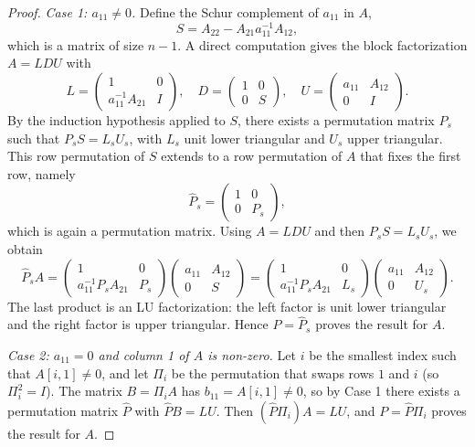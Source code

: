 \documentclass[10pt,twoside]{siamart1116}
\numberwithin{theorem}{section}
\begin{document}
\begin{proof}
  \emph{Case 1: $a_{11} \neq 0$.} Define the Schur complement of $a_{11}$ in $A$,
  \[
    S = A_{22} - A_{21} a_{11}^{-1} A_{12},
  \]
  which is a matrix of size $n-1$. A direct computation gives the block factorization $A = LDU$ with
  \[
    L =
    \begin{pmatrix}
      1                  & 0 \\
      a_{11}^{-1} A_{21} & I
    \end{pmatrix}, \quad
    D =
    \begin{pmatrix}
      1 & 0 \\
      0 & S
    \end{pmatrix}, \quad
    U =
    \begin{pmatrix}
      a_{11} & A_{12} \\
      0      & I
    \end{pmatrix}.
  \]
  By the induction hypothesis applied to $S$, there exists a permutation matrix $P_s$ such that $P_s S = L_s U_s$, with $L_s$ unit lower triangular and $U_s$ upper triangular. This row permutation of $S$ extends to a row permutation of $A$ that fixes the first row, namely
  \[
    \widehat{P}_s =
    \begin{pmatrix}
      1 & 0   \\
      0 & P_s
    \end{pmatrix},
  \]
  which is again a permutation matrix. Using $A = LDU$ and then $P_s S = L_s U_s$, we obtain
  \[
    \widehat{P}_s A
    =
    \begin{pmatrix}
      1                    & 0   \\
      a_{11}^{-1} P_s A_{21} & P_s
    \end{pmatrix}
    \begin{pmatrix}
      a_{11} & A_{12} \\
      0      & S
    \end{pmatrix}
    =
    \begin{pmatrix}
      1                    & 0   \\
      a_{11}^{-1} P_s A_{21} & L_s
    \end{pmatrix}
    \begin{pmatrix}
      a_{11} & A_{12} \\
      0      & U_s
    \end{pmatrix}.
  \]
  The last product is an LU factorization: the left factor is unit lower triangular and the right factor is upper triangular. Hence $P = \widehat{P}_s$ proves the result for $A$.

  \emph{Case 2: $a_{11} = 0$ and column 1 of $A$ is non-zero.} Let $i$ be the smallest index such that $A[i,1] \neq 0$, and let $\Pi_i$ be the permutation that swaps rows $1$ and $i$ (so $\Pi_i^2 = I$). The matrix $B = \Pi_i A$ has $b_{11} = A[i,1] \neq 0$, so by Case 1 there exists a permutation matrix $\widehat{P}$ with $\widehat{P} B = LU$. Then $(\widehat{P} \Pi_i) A = LU$, and $P = \widehat{P} \Pi_i$ proves the result for $A$.


\end{proof}
\end{document}
